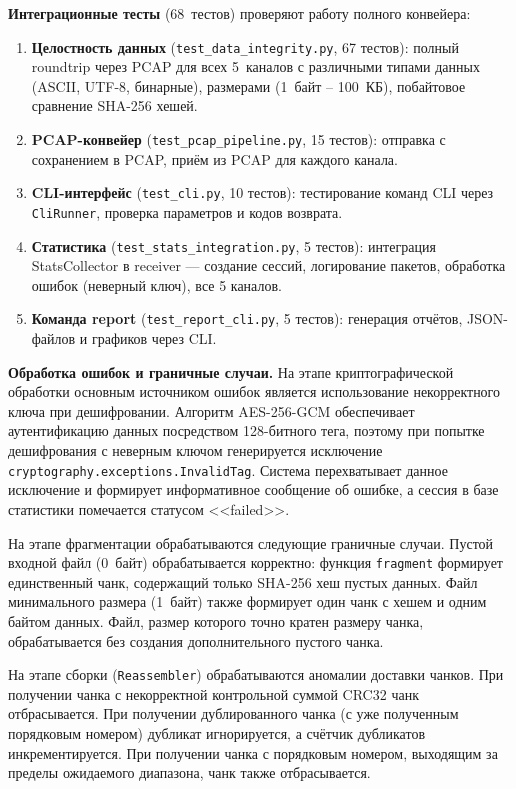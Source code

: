 \textbf{Интеграционные тесты} (68~тестов) проверяют работу полного конвейера:

\begin{enumerate}[label=\arabic*)]
    \item \textbf{Целостность данных} (\texttt{test\_data\_integrity.py}, 67 тестов): полный roundtrip через PCAP для всех 5~каналов с различными типами данных (ASCII, UTF-8, бинарные), размерами (1~байт -- 100~КБ), побайтовое сравнение SHA-256 хешей.
    \item \textbf{PCAP-конвейер} (\texttt{test\_pcap\_pipeline.py}, 15 тестов): отправка с сохранением в PCAP, приём из PCAP для каждого канала.
    \item \textbf{CLI-интерфейс} (\texttt{test\_cli.py}, 10 тестов): тестирование команд CLI через \texttt{CliRunner}, проверка параметров и кодов возврата.
    \item \textbf{Статистика} (\texttt{test\_stats\_integration.py}, 5 тестов): интеграция StatsCollector в receiver --- создание сессий, логирование пакетов, обработка ошибок (неверный ключ), все 5 каналов.
    \item \textbf{Команда report} (\texttt{test\_report\_cli.py}, 5 тестов): генерация отчётов, JSON-файлов и графиков через CLI.
\end{enumerate}

\textbf{Обработка ошибок и граничные случаи.} На этапе криптографической обработки основным источником ошибок является использование некорректного ключа при дешифровании. Алгоритм AES-256-GCM обеспечивает аутентификацию данных посредством 128-битного тега, поэтому при попытке дешифрования с неверным ключом генерируется исключение \texttt{cryptography.exceptions.InvalidTag}. Система перехватывает данное исключение и формирует информативное сообщение об ошибке, а сессия в базе статистики помечается статусом <<failed>>.

На этапе фрагментации обрабатываются следующие граничные случаи. Пустой входной файл (0~байт) обрабатывается корректно: функция \texttt{fragment} формирует единственный чанк, содержащий только SHA-256 хеш пустых данных. Файл минимального размера (1~байт) также формирует один чанк с хешем и одним байтом данных. Файл, размер которого точно кратен размеру чанка, обрабатывается без создания дополнительного пустого чанка.

На этапе сборки (\texttt{Reassembler}) обрабатываются аномалии доставки чанков. При получении чанка с некорректной контрольной суммой CRC32 чанк отбрасывается. При получении дублированного чанка (с уже полученным порядковым номером) дубликат игнорируется, а счётчик дубликатов инкрементируется. При получении чанка с порядковым номером, выходящим за пределы ожидаемого диапазона, чанк также отбрасывается.


